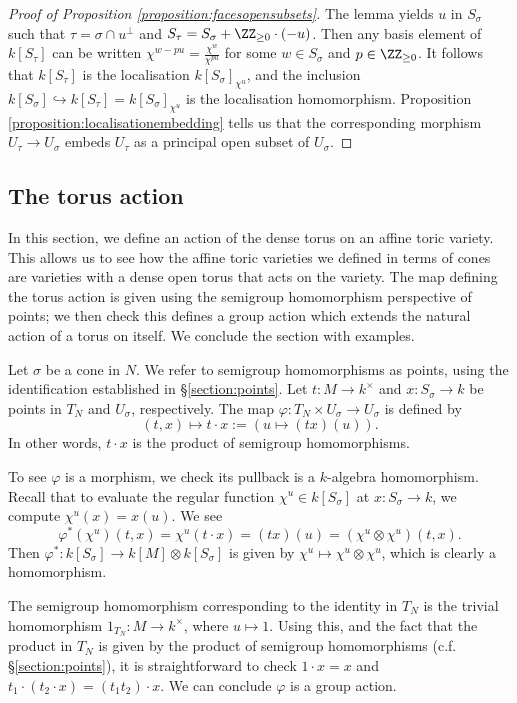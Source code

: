 \documentclass[12pt]{amsart}
\theoremstyle{plain}
\begin{document}
\begin{proof}[{Proof of Proposition \ref{proposition:facesopensubsets}}]
The lemma yields $u$ in $S_\sigma$ such that $\tau = \sigma \cap u^\perp$ and $S_\tau = S_\sigma + \ZZ_{\ge 0} \cdot (-u)$.
Then any basis element of $k[S_\tau]$ can be written $\chi^{w - pu} = \frac{\chi^w}{\chi^{pu}}$ for some $w \in S_\sigma$ and $p \in \ZZ_{\ge 0}$.
It follows that $k[S_\tau]$ is the localisation $k[S_\sigma]_{\chi^u}$, and the inclusion $k[S_\sigma] \hookrightarrow k[S_\tau] = k[S_\sigma]_{\chi^u}$ is the localisation homomorphism.
Proposition \ref{proposition:localisationembedding} tells us that the corresponding morphism $U_\tau \to U_\sigma$ embeds $U_\tau$ as a principal open subset of $U_\sigma$.
\end{proof}

\subsection{The torus action}\label{section:thetorusaction}
In this section, we define an action of the dense torus on an affine toric variety.
This allows us to see how the affine toric varieties we defined in terms of cones are varieties with a dense open torus that acts on the variety.
The map defining the torus action is given using the semigroup homomorphism perspective of points;
we then check this defines a group action which extends the natural action of a torus on itself.
We conclude the section with examples.

Let $\sigma$ be a cone in $N$.
We refer to semigroup homomorphisms as points, using the identification established in \S\ref{section:points}.
Let $t : M \to k^\times$ and $x : S_\sigma \to k$ be points in $T_N$ and $U_\sigma$, respectively.
The map $\varphi : T_N \times U_\sigma \to U_\sigma$ is defined by 
$$(t, x) \mapsto t \cdot x := (u \mapsto (tx)(u)).$$
In other words, $t \cdot x$ is the product of semigroup homomorphisms.

To see $\varphi$ is a morphism, we check its pullback is a $k$-algebra homomorphism.
Recall that to evaluate the regular function $\chi^u \in k[S_\sigma]$ at $x : S_\sigma \to k$, we compute $\chi^u(x) = x(u)$.
We see
$$\varphi^*(\chi^u)(t, x) = \chi^u(t\cdot x) = (tx)(u) = (\chi^u \otimes \chi^u)(t,x).$$
Then $\varphi^* : k[S_\sigma] \to k[M] \otimes k[S_\sigma]$ is given by $\chi^u \mapsto \chi^u \otimes \chi^u$, which is clearly a homomorphism.

The semigroup homomorphism corresponding to the identity in $T_N$ is the trivial homomorphism $1_{T_N} : M \to k^\times$, where $u \mapsto 1$.
Using this, and the fact that the product in $T_N$ is given by the product of semigroup homomorphisms (c.f. \S \ref{section:points}), it is straightforward to check $1 \cdot x = x$ and $t_1\cdot(t_2\cdot x) = (t_1t_2)\cdot x$.
We can conclude $\varphi$ is a group action.
\end{document}
